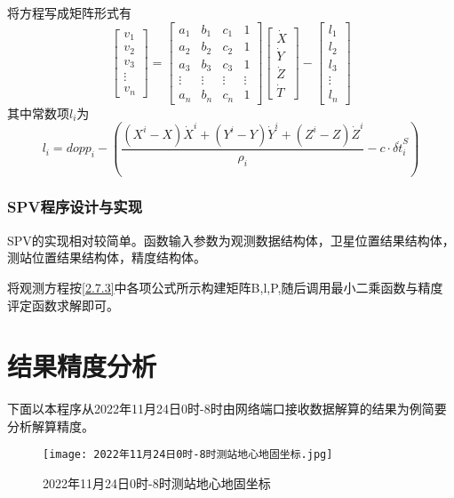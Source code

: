 \documentclass{ctexart}
\begin{document}
将方程写成矩阵形式有
\begin{equation}
\begin{bmatrix}
v_1\\
v_2\\
v_3\\
\vdots\\
v_n
\end{bmatrix}=\begin{bmatrix}
a_1&b_1&c_1&1\\
a_2&b_2&c_2&1\\
a_3&b_3&c_3&1\\
\vdots&\vdots&\vdots&\vdots\\
a_n&b_n&c_n&1
\end{bmatrix}\begin{bmatrix}
\dot{X}\\
\dot{Y}\\
\dot{Z}\\
\dot{T}
\end{bmatrix}-\begin{bmatrix}
l_1\\
l_2\\
l_3\\
\vdots\\
l_n
\end{bmatrix}
\end{equation}
其中常数项$l_i$为
\begin{equation}
l_i=dopp_i-\left(\dfrac{(X^i-X)\dot{X}^i+(Y^i-Y)\dot{Y}^i+(Z^i-Z)\dot{Z}^i}{\rho_i}-c\cdot\delta\dot{t}^S_i\right)
\end{equation}

\subsubsection{SPV程序设计与实现}
SPV的实现相对较简单。函数输入参数为观测数据结构体，卫星位置结果结构体，测站位置结果结构体，精度结构体。

将观测方程按\ref{2.7.3}中各项公式所示构建矩阵B,l,P,随后调用最小二乘函数与精度评定函数求解即可。
\vfill
\section{结果精度分析}

下面以本程序从2022年11月24日0时-8时由网络端口接收数据解算的结果为例简要分析解算精度。

\begin{figure}[H]
\texttt{[image: 2022年11月24日0时-8时测站地心地固坐标.jpg]}
\caption{2022年11月24日0时-8时测站地心地固坐标}
\end{figure}
\end{document}
